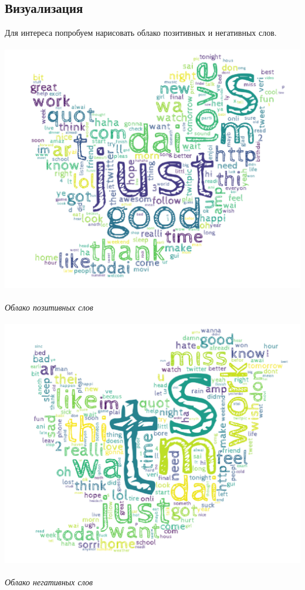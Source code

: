 \documentclass[12pt, a4paper]{article}
\begin{document}
        \subsection{Визуализация}
            Для интереса попробуем нарисовать облако позитивных и негативных слов.
            \begin{singlespace}
                \begin{center}
                    \includegraphics[height=11cm]{twitter_wordcloud_pos.png}

                    \textit{Облако позитивных слов}

                    \vfill

                    \includegraphics[height=11cm]{twitter_wordcloud_neg.png}

                    \textit{Облако негативных слов}
                \end{center}
            \end{singlespace}
\end{document}
